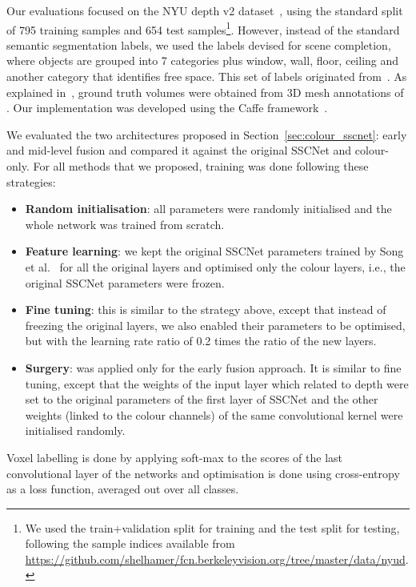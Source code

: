 Our evaluations focused on the NYU depth v2
dataset~\cite{silberman_etal_eccv2012}, using the standard
split of 795 training samples and 654 test samples\footnote{We used the
  train+validation split for training and the test split for testing,
  following the sample indices available from \url{https://github.com/shelhamer/fcn.berkeleyvision.org/tree/master/data/nyud}.}. However, instead of the standard semantic segmentation
labels, we used the labels devised for scene completion, where objects
are grouped into 7 categories plus window, wall, floor, ceiling
and another category that identifies free space.
This set of labels originated from~\cite{handa_etal_SceneNet_cvpr2016}.
As explained in~\cite{song_etal_SSCnet_cvpr2017}, ground truth
volumes were obtained from 3D mesh annotations of \cite{guo_etal_Complete3D_arxiv2015}.
Our implementation was developed using the Caffe framework~\cite{jia_etal_Caffe_arXiv2014}.

We evaluated the two architectures proposed in Section~\ref{sec:colour_sscnet}:
early and mid-level fusion and compared it against the original SSCNet
and colour-only. For all methods that we proposed, training
was done following these strategies: 
\begin{itemize}
\item {\bf Random initialisation}: all parameters were randomly
  initialised and the whole network was trained
  from scratch.
\item {\bf Feature learning}: we kept the original SSCNet parameters trained by
  Song et al.~\cite{song_etal_SSCnet_cvpr2017} for all the original layers
  and optimised only the colour layers, i.e., the original SSCNet
  parameters were frozen.
\item {\bf Fine tuning}: this is similar to the strategy above, except that
  instead of freezing the original layers, we also enabled their parameters
  to be optimised, but with the  learning rate ratio of 0.2 times
  the ratio of the new layers.
\item {\bf Surgery}: was applied only for the early fusion approach. It is similar
  to fine tuning, except that the weights of the input layer which
  related to depth were set to the original parameters of the first layer of
  SSCNet and the other weights (linked to the colour channels) of the same
  convolutional kernel were initialised randomly.
\end{itemize}

Voxel labelling is done by applying soft-max to the scores of the
last convolutional layer of the networks and optimisation is done
using cross-entropy as a loss function, averaged out over all classes.






